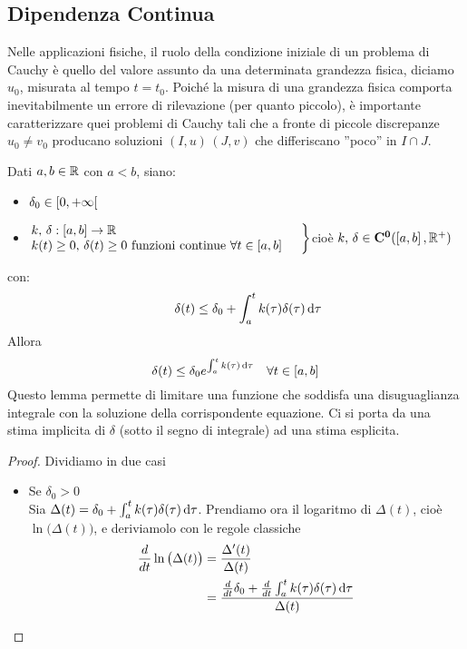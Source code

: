 \subsection{Dipendenza Continua}
Nelle applicazioni fisiche, il ruolo della condizione iniziale di un problema di Cauchy è quello del valore assunto da una determinata grandezza fisica, diciamo $u_0$, misurata al tempo $t=t_0$. Poiché la misura di una grandezza fisica comporta inevitabilmente un errore di rilevazione (per quanto piccolo), è importante caratterizzare quei problemi di Cauchy tali che a fronte di piccole discrepanze $u_0 \neq v_0$ producano soluzioni $(I,u)\,(J,v)$ che differiscano ”poco” in $I\cap J$.
\begin{lemma}
	\label{lemma:gronwall}
	Dati $a,b\in \mathbb{R}$ con $a < b$, siano:
	\begin{itemize}[noitemsep]
		\item $\delta_0\in \left[0,+\infty\right[$
		\item $\hspace{-0.5em}\left.\begin{array}{ll}
				k,\,\delta:\left[a,b\right]\to \mathbb{R} \\
				k(t)\geq 0,\,\delta(t) \geq 0 \text{ funzioni continue } \forall t \in \left[a,b\right]
		\end{array} \quad\right\}$\quad cioè \quad$k,\,\delta\in\mathbf{C^{0}}(\left[a,b\right],\mathbb{R}^{+})$
	\end{itemize}
	con:
	\[\qquad \delta(t) \leq \delta_0+\int_{a}^{t}k(\tau)\delta(\tau)\,\mathrm{d}{\tau}\]
	Allora
	\[\delta(t) \leq \delta_0e^{\int_{a}^{t}k(\tau)\,\mathrm{d}{\tau}} \quad \forall t \in \left[a,b\right]\]
	Questo lemma permette di limitare una funzione che soddisfa una disuguaglianza integrale con la soluzione della corrispondente equazione. Ci si porta da una stima implicita di $\delta$ (sotto il segno di integrale) ad una stima esplicita.
	\begin{proof}
		Dividiamo in due casi
		\begin{itemize}
			\item Se $\delta_0>0$\\
				Sia $\Delta(t) = \delta_0+\int_{a}^{t}k(\tau)\delta(\tau)\,\mathrm{d}{\tau}$. Prendiamo ora il logaritmo di $\Delta(t)$, cioè $\ln{\bigl(\Delta(t)\bigr)}$, e deriviamolo con le regole classiche
				\begin{align*}
					\frac{d}{dt}\ln{\bigl(\Delta(t)\bigr)} &= \frac{\Delta'(t)}{\Delta(t)}\\
					&= \frac{\frac{d}{dt}\delta_0 + \frac{d}{dt}\int_{a}^{t}k(\tau)\delta(\tau)\integrald{\tau}}{\Delta(t)}

\end{align*}
\end{itemize}
\end{proof}
\end{lemma}
